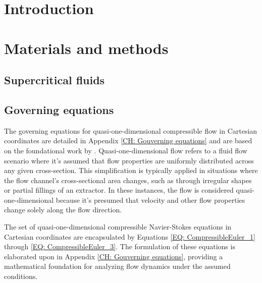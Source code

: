 \documentclass[a4paper,fleqn]{cas-dc}
\begin{document}

\section{Introduction}


\section{Materials and methods} \label{CH: Materials and methods}

\subsection{Supercritical fluids} \label{CH: Thermodynamic}


\subsection{Governing equations} \label{CH:Governing_equations_chapter}
	The governing equations for quasi-one-dimensional compressible flow in Cartesian coordinates are detailed in Appendix \ref{CH: Gouverning equations} and are based on the foundational work by \citet{Anderson1995}. Quasi-one-dimensional flow refers to a fluid flow scenario where it's assumed that flow properties are uniformly distributed across any given cross-section. This simplification is typically applied in situations where the flow channel's cross-sectional area changes, such as through irregular shapes or partial fillings of an extractor. In these instances, the flow is considered quasi-one-dimensional because it's presumed that velocity and other flow properties change solely along the flow direction.
	
	The set of quasi-one-dimensional compressible Navier-Stokes equations in Cartesian coordinates are encapsulated by Equations \ref{EQ: CompressibleEuler_1} through \ref{EQ: CompressibleEuler_3}. The formulation of these equations is elaborated upon in Appendix \ref{CH: Gouverning equations}, providing a mathematical foundation for analyzing flow dynamics under the assumed conditions.
\end{document}
